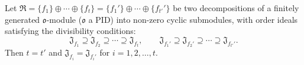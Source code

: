 Let $\mathfrak{R} = \{f_1\} \oplus \cdots \oplus \{f_t\} = \{f_1'\} \oplus \cdots \oplus \{f_{t'}'\}$ be two decompositions of a finitely generated $\mathfrak{o}$-module ($\mathfrak{o}$ a PID) into non-zero cyclic submodules, with order ideals satisfying the divisibility conditions:
$$\mathfrak{J}_{f_1} \supseteq \mathfrak{J}_{f_2} \supseteq \cdots \supseteq \mathfrak{J}_{f_t}, \qquad \mathfrak{J}_{f_1'} \supseteq \mathfrak{J}_{f_2'} \supseteq \cdots \supseteq \mathfrak{J}_{f_{t'}'}.$$
Then $t = t'$ and $\mathfrak{J}_{f_i} = \mathfrak{J}_{f_i'}$ for $i = 1, 2, \ldots, t$.
